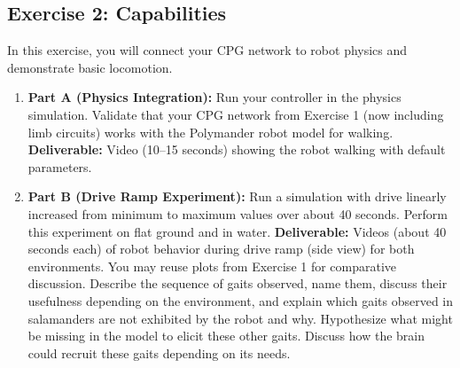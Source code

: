 \documentclass{cmc}
\begin{document}

\newpage
\subsection{Exercise 2: Capabilities}\label{sec:capabilities}

In this exercise, you will connect your CPG network to robot physics and demonstrate basic locomotion.

\begin{enumerate}
\item \textbf{Part A (Physics Integration):} Run your controller in the physics simulation. Validate that your CPG network from Exercise 1 (now including limb circuits) works with the Polymander robot model for walking.
  \textbf{Deliverable:} Video (10--15 seconds) showing the robot walking with default parameters.

\item \textbf{Part B (Drive Ramp Experiment):} Run a simulation with drive linearly increased from minimum to maximum values over about 40 seconds. Perform this experiment on flat ground and in water.
  \textbf{Deliverable:} Videos (about 40 seconds each) of robot behavior during drive ramp (side view) for both environments. You may reuse plots from Exercise 1 for comparative discussion. Describe the sequence of gaits observed, name them, discuss their usefulness depending on the environment, and explain which gaits observed in salamanders are not exhibited by the robot and why. Hypothesize what might be missing in the model to elicit these other gaits. Discuss how the brain could recruit these gaits depending on its needs.
\end{enumerate}



\end{document}
